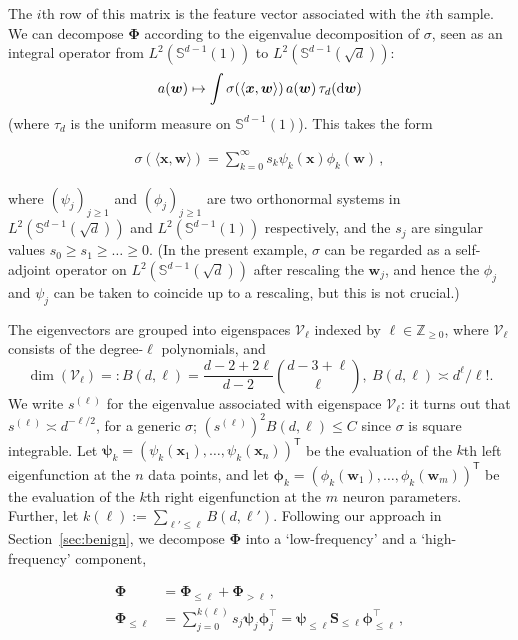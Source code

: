 The $i$th row of this matrix is the feature vector associated with the $i$th sample. We can decompose
${\boldsymbol \Phi}$ according to the eigenvalue decomposition of $\sigma$, seen as an integral operator from $L^2(\mathbb{S}^{d-1}(1))$ to $L^2(\mathbb{S}^{d-1}(\sqrt{d}))$:
$$a({\boldsymbol w})\mapsto \int\sigma(\langle{\boldsymbol x},{\boldsymbol w}\rangle)\,
a({\boldsymbol w})\,\tau_d({\rm d}{\boldsymbol w})$$ (where $\tau_d$ is the uniform measure on
$\mathbb{S}^{d-1}(1)$).
This takes the form

\begin{align}
  \sigma(\langle{\boldsymbol x},{\boldsymbol w}\rangle) = \sum_{k=0}^{\infty}s_{k}\psi_k({\boldsymbol x})\phi_k({\boldsymbol w})\, ,
\end{align}

where $(\psi_j)_{j\ge 1}$ and $(\phi_j)_{j\ge 1}$ are two orthonormal systems in $L^2(\mathbb{S}^{d-1}(\sqrt{d}))$ and  $L^2(\mathbb{S}^{d-1}(1))$
respectively, and the $s_{j}$ are singular values $s_0\ge
s_1\ge \dots \ge 0$. (In the present example, $\sigma$ can be regarded as a self-adjoint operator on
$L^2(\mathbb{S}^{d-1}(\sqrt{d}))$ after rescaling the ${\boldsymbol w}_j$, and hence the $\phi_j$ and $\psi_j$ can be taken to coincide up to a rescaling, but this is not crucial.)

The eigenvectors are grouped into eigenspaces ${\mathcal V}_{\ell}$ indexed by $\ell\in{\mathbb Z}_{\ge 0}$, where ${\mathcal V}_{\ell}$ consists of the degree-$\ell$ polynomials, and
$$\dim({\mathcal V}_{\ell}) =: B(d,\ell) =
\frac{d-2+2\ell}{d-2}\binom{d-3+\ell}{\ell},~ B(d,\ell)\asymp
d^{\ell}/\ell!.$$ 
We write $s^{(\ell)}$ for the eigenvalue associated with eigenspace ${\mathcal V}_{\ell}$:
it turns out that $s^{(\ell)}\asymp d^{-\ell/2}$, for a generic
$\sigma$; $(s^{(\ell)})^2B(d,\ell)\le C$ since $\sigma$
is square integrable. Let ${\boldsymbol \psi}_k = (\psi_k({\boldsymbol x}_1),\dots,\psi_k({\boldsymbol x}_n))^{{\mathsf T}}$ be the evaluation of the $k$th left eigenfunction at the $n$ data points, and let ${\boldsymbol \phi}_k = (\phi_k({\boldsymbol w}_1),\dots,\phi_k({\boldsymbol w}_m))^{{\mathsf T}}$ be the evaluation of the $k$th right eigenfunction at the $m$ neuron parameters. Further, let
$k(\ell) := \sum_{\ell'\le \ell}B(d,\ell')$.  Following our approach in Section~\ref{sec:benign}, we decompose ${\boldsymbol \Phi}$ into a `low-frequency' and a `high-frequency' component,

\begin{align}
  {\boldsymbol \Phi} &= {\boldsymbol \Phi}_{\le \ell}+{\boldsymbol \Phi}_{>\ell}\, ,\label{eq:PhiDecomposition}\\
  {\boldsymbol \Phi}_{\le \ell} & = \sum_{j=0}^{k(\ell)}s_j
  {\boldsymbol \psi}_{j}{\boldsymbol \phi}_j^\top =
   {\boldsymbol \psi}_{\le \ell}{\boldsymbol S}_{\le \ell} {\boldsymbol \phi}_{\le \ell}^\top\, ,
\end{align}

